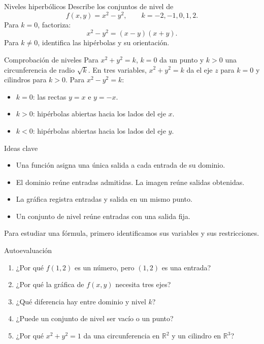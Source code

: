 \begin{frame}{Niveles hiperbólicos}
Describe los conjuntos de nivel de
\[f(x,y)=x^2-y^2,\qquad k=-2,-1,0,1,2.\]
Para $k=0$, factoriza:
\[x^2-y^2=(x-y)(x+y).\]
Para $k\ne0$, identifica las hipérbolas y su orientación.
\end{frame}
\begin{frame}{Comprobación de niveles}
Para $x^2+y^2=k$, $k=0$ da un punto y $k>0$ una circunferencia de radio $\sqrt k$.
\medskip
En tres variables, $x^2+y^2=k$ da el eje $z$ para $k=0$ y cilindros para $k>0$.
\medskip
Para $x^2-y^2=k$:
\begin{itemize}
\item $k=0$: las rectas $y=x$ e $y=-x$.
\item $k>0$: hipérbolas abiertas hacia los lados del eje $x$.
\item $k<0$: hipérbolas abiertas hacia los lados del eje $y$.
\end{itemize}
\end{frame}
\begin{frame}{Ideas clave}
\begin{itemize}
\item Una función asigna una única salida a cada entrada de su dominio.
\item El dominio reúne entradas admitidas. La imagen reúne salidas obtenidas.
\item La gráfica registra entradas y salida en un mismo punto.
\item Un conjunto de nivel reúne entradas con una salida fija.
\end{itemize}
Para estudiar una fórmula, primero identificamos sus variables y sus restricciones.
\end{frame}
\begin{frame}{Autoevaluación}
\begin{enumerate}
\item ¿Por qué $f(1,2)$ es un número, pero $(1,2)$ es una entrada?
\item ¿Por qué la gráfica de $f(x,y)$ necesita tres ejes?
\item ¿Qué diferencia hay entre dominio y nivel $k$?
\item ¿Puede un conjunto de nivel ser vacío o un punto?
\item ¿Por qué $x^2+y^2=1$ da una circunferencia en $\mathbb R^2$ y un cilindro en $\mathbb R^3$?
\end{enumerate}
\end{frame}

